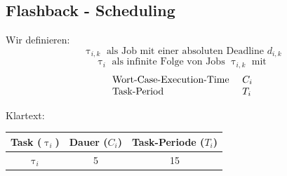 \subsection{Flashback - Scheduling}
\begin{frame}{\subsecname}
	Wir definieren:
	\begin{equation}
		\uptau_{i, k} \text{ als Job mit einer absoluten Deadline } d_{i, k}
	\end{equation}
	\pause
	\begin{equation}
		\uptau_i \text{ als infinite Folge von Jobs } \uptau_{i, k} \text{ mit }
	\end{equation}
	\pause
	\begin{equation}
		\begin{array}{l l l}
			\text{Wort-Case-Execution-Time } & C_i\\
			\text{Task-Period } & T_i
		\end{array}
	\end{equation}
\end{frame}

\begin{frame}
	Klartext:\\
	\begin{center}
		\begin{tabular}{c||c|c}
			Task ($\uptau_i$) & Dauer ($C_i$) & Task-Periode ($T_i$)\\\hline\hline
			$\uptau_i$ & 5 & 15
		\end{tabular}
	\end{center}
\end{frame}

\begin{frame}
	
\end{frame}

\begin{frame}
	
\end{frame}

\begin{frame}
	
\end{frame}

\begin{frame}
	
\end{frame}

